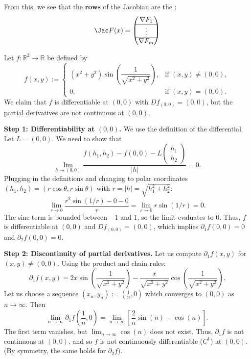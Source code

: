 From this, we see that the \textbf{rows} of the Jacobian are the 
:
\[\Jac F(x) = \begin{pmatrix} \nabla F_1 \\ \hline \vdots \\ \hline \nabla F_m \end{pmatrix}\]


\begin{example}
\label{ex:differentiable_not_c1}
Let $f : \mathbb{R}^2 \to \mathbb{R}$ be defined by
\[
f(x,y) := \begin{cases}
  (x^2+y^2)\sin\left(\dfrac{1}{\sqrt{x^2+y^2}}\right), & \text{if } (x,y) \neq (0,0), \\
  0, & \text{if } (x,y) = (0,0).
\end{cases}
\]
We claim that $f$ is differentiable at $(0,0)$ with $Df_{(0,0)} = (0, 0)$, but the partial derivatives are not continuous at $(0,0)$. 

\textbf{Step 1: Differentiability at $(0,0)$.} We use the definition of the differential. Let $L = (0, 0)$. We need to show that
\[
  \lim_{h \to (0,0)} \frac{f(h_1, h_2) - f(0,0) - L\begin{pmatrix}h_1\\h_2\end{pmatrix}}{|h|} = 0.
\]
Plugging in the definitions and changing to polar coordinates $(h_1, h_2) = (r\cos\theta, r\sin\theta)$ with $r = |h| = \sqrt{h_1^2+h_2^2}$:
\[
  \lim_{r \to 0} \frac{r^2 \sin(1/r) - 0 - 0}{r} = \lim_{r \to 0} r \sin(1/r) = 0.
\]
The sine term is bounded between $-1$ and $1$, so the limit evaluates to $0$. Thus, $f$ is differentiable at $(0,0)$ and $Df_{(0,0)} = (0, 0)$, which implies $\partial_1 f(0,0) = 0$ and $\partial_2 f(0,0) = 0$.

\textbf{Step 2: Discontinuity of partial derivatives.} Let us compute $\partial_1 f(x,y)$ for $(x,y) \neq (0,0)$. Using the product and chain rules:
\[
  \partial_1 f(x,y) = 2x \sin\left(\frac{1}{\sqrt{x^2+y^2}}\right) - \frac{x}{\sqrt{x^2+y^2}} \cos\left(\frac{1}{\sqrt{x^2+y^2}}\right).
\]
Let us choose a sequence $(x_n, y_n) := (\frac{1}{n}, 0)$ which converges to $(0,0)$ as $n \to \infty$. Then
\[
  \lim_{n \to \infty} \partial_1 f\left(\frac{1}{n}, 0\right) = \lim_{n \to \infty} \left[ \frac{2}{n} \sin(n) - \cos(n) \right].
\]
The first term vanishes, but $\lim_{n \to \infty} \cos(n)$ does not exist. Thus, $\partial_1 f$ is not continuous at $(0,0)$, and so $f$ is not continuously differentiable ($C^1$) at $(0,0)$. (By symmetry, the same holds for $\partial_2 f$).
\end{example}


